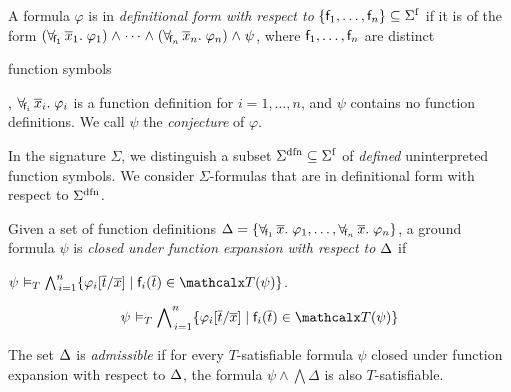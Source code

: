 \begin{definition}\rm
A formula $\varphi$ is in \emph{definitional form with respect to}
$\{ \con{f}_1, \ldots, \con{f}_n \} \subseteq \sfuns{\Sigma}$ if it is of the
form
%
%
$(\forallf{\con{f}_1} \vec x_1.\; \varphi_1) \wedge \cdots \wedge
(\forallf{\con{f}_n} \vec x_n.\; \varphi_n) \wedge \psi$,
%
where $\mathsf{f}_1, \ldots, \mathsf{f}_n$ are distinct\begin{longv} function symbols\end{longv},
$\forall_{\!\mathsf{f}_i\:} \overline{x}_i.\; \varphi_i$ is a function definition
for $i = 1, \ldots, n$,
%
and $\psi$ contains no function definitions.
We call $\psi$ the \emph{conjecture} of $\varphi$.
\end{definition}

In the signature $\Sigma$, we distinguish a subset $\sfundefs{\Sigma}
\subseteq \sfuns{\Sigma}$ of \emph{defined} uninterpreted function symbols.
We consider $\Sigma$-formulas that are in definitional form with respect to
$\sfundefs{\Sigma}$.

\newcommand\closurefmla{\psi \models_T \bigwedge\nolimits_{\,i=1}^{n} \{ \varphi_i[ \vec t / \vec x ] \mid \con{f}_i( \vec t ) \in \terms( \psi ) \}}

\begin{definition}\rm
Given a set of function definitions 
$\DDD = \{ \forallf{\con{f}_1} \vec x.\; \varphi_1, \ldots, \forallf{\con{f}_n} \vec x.\; \varphi_n \}$, 
a ground formula $\psi$ 
is \emph{closed under function expansion with respect to $\DDD$} if
\begin{shortv}$\closurefmla$. \end{shortv}%
\begin{longv}\[\closurefmla\]\end{longv}%
The set $\DDD$ is \emph{admissible} if for every $T$-satisfiable formula 
$\psi$ closed under function expansion with respect to $\DDD$,
the formula
$\psi \wedge \bigwedge \Delta$ is also $T$-satisfiable.
\end{definition}

